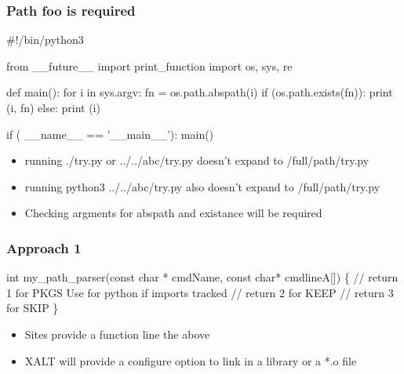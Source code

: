 \documentclass{beamer}
\begin{document}
\begin{frame}[fragile]
    \frametitle{Path foo is required}
 {\tiny
    \begin{semiverbatim}
#!/bin/python3

from __future__ import print_function
import os, sys, re

def main():
  for i in sys.argv:
    fn = os.path.abspath(i)
    if (os.path.exists(fn)):
      print (i, fn)
    else:
      print (i)
      
if ( __name__ == '__main__'): main()
    \end{semiverbatim}
}
  \begin{itemize}
    \item running ./try.py or ../../abc/try.py doesn't expand to
      /full/path/try.py
    \item running python3 ../../abc/try.py also doesn't expand to
      /full/path/try.py
    \item Checking argments for abspath and existance will be required
  \end{itemize}

\end{frame}

\begin{frame}[fragile]
    \frametitle{Approach 1}
 {\tiny
    \begin{semiverbatim}
       int my_path_parser(const char * cmdName, const char* cmdlineA[])
       \{
         // return 1 for PKGS  Use for python if imports tracked
         // return 2 for KEEP
         // return 3 for SKIP
       \}
        
    \end{semiverbatim}
}
  \begin{itemize}
    \item Sites provide a function line the above
    \item XALT will provide a configure option to link in a library or
      a *.o file
  \end{itemize}

\end{frame}
\end{document}
